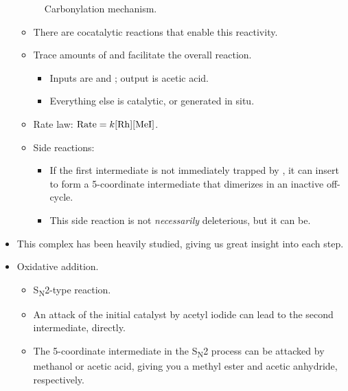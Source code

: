 \documentclass[../notes.tex]{subfiles}
\begin{document}
\begin{itemize}
\begin{figure}[h!]
        \caption{Carbonylation mechanism.}
        \label{fig:mechanism-carbonylation}
    \end{figure}
    \begin{itemize}
        \item There are cocatalytic reactions that enable this reactivity.
        \item Trace amounts of  and  facilitate the overall reaction.
        \begin{itemize}
            \item Inputs are  and ; output is acetic acid.
            \item Everything else is catalytic, or generated in situ.
        \end{itemize}
        \item Rate law: $\text{Rate}=k\ce{[Rh][MeI]}$.
        \item Side reactions:
        \begin{itemize}
            \item If the first intermediate is not immediately trapped by , it can insert to form a 5-coordinate intermediate that dimerizes in an inactive off-cycle.
            \item This side reaction is not \emph{necessarily} deleterious, but it can be.
        \end{itemize}
    \end{itemize}
    \item This complex has been heavily studied, giving us great insight into each step.
    \item Oxidative addition.
    \begin{itemize}
        \item S\textsubscript{N}2-type reaction.
        \item An attack of the initial catalyst by acetyl iodide can lead to the second intermediate, directly.
        \item The 5-coordinate intermediate in the S\textsubscript{N}2 process can be attacked by methanol or acetic acid, giving you a methyl ester and acetic anhydride, respectively.

\end{itemize}
\end{itemize}
\end{document}
